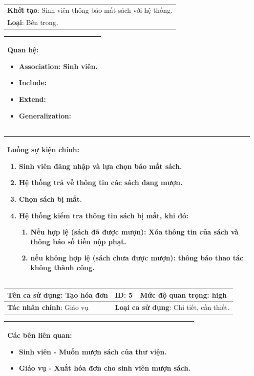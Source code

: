 \documentclass[12pt]{report}
\begin{document}
\begin{center}
\begin{tabular}{| m{15.9cm} |}
    \hline
    \textbf{Khởi tạo}: Sinh viên thông báo mất sách với hệ thống. \\
    \textbf{Loại}: Bên trong.  \\
    \hline
\end{tabular}

\begin{tabular}{| m{15.9cm} |}
    \hline
    \textbf{Quan hệ}:
    \begin{itemize}
        \item Association: Sinh viên.
        \item Include: 
        \item Extend: 
        \item Generalization: 
    \end{itemize} \\
    \hline
\end{tabular}

\begin{tabular}{| m{15.9cm} |}
    \hline
    \textbf{Luồng sự kiện chính}:
    \begin{enumerate}
        \item Sinh viên đăng nhập và lựa chọn báo mất sách. 
        \item Hệ thống trả về thông tin các sách đang mượn.
        \item Chọn sách bị mất.
        \item Hệ thống kiểm tra thông tin sách bị mất, khi đó:
        \begin{enumerate}
            \item Nếu hợp lệ (sách đã được mượn): Xóa thông tin của sách và thông báo số tiền nộp phạt.
            \item nếu không hợp lệ (sách chưa được mượn): thông báo thao tác không thành công. 
        \end{enumerate}
    \end{enumerate} \\
    \hline
\end{tabular}

\newpage
\begin{tabular}{| m{6cm} | m{3cm} | m{6cm} |}
    \hline
    \textbf{Tên ca sử dụng}: Tạo hóa đơn & \textbf{ID}: 5 & \textbf{Mức độ quan trọng}: high \\
    \hline
    \textbf{Tác nhân chính}: Giáo vụ  & \multicolumn{2}{|l|}{\textbf{Loại ca sử dụng}: Chi tiết, cần thiết.} \\
    \hline
\end{tabular}
\begin{tabular}{| m{15.9cm} |}
    \hline
        \textbf{Các bên liên quan:} 
        \begin{itemize}
            \item Sinh viên - Muốn mượn sách của thư viện. 
            \item Giáo vụ - Xuất hóa đơn cho sinh viên mượn sách. 
        \end{itemize} \\
    \hline
\end{tabular}


\end{center}
\end{document}

